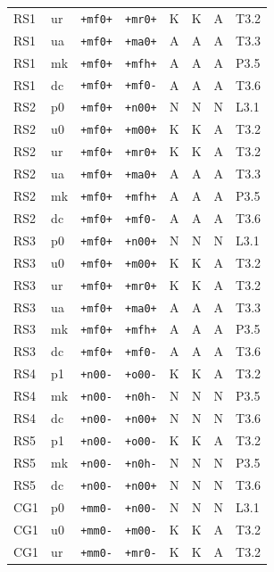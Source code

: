 {\begin{longtable}{@{}llllcccl@{}}
RS1 & ur & \texttt{+mf0+} & \texttt{+mr0+} & K & K & A & T3.2 \\
RS1 & ua & \texttt{+mf0+} & \texttt{+ma0+} & A & A & A & T3.3 \\
RS1 & mk & \texttt{+mf0+} & \texttt{+mfh+} & A & A & A & P3.5 \\
RS1 & dc & \texttt{+mf0+} & \texttt{+mf0-} & A & A & A & T3.6 \\
RS2 & p0 & \texttt{+mf0+} & \texttt{+n00+} & N & N & N & L3.1 \\
RS2 & u0 & \texttt{+mf0+} & \texttt{+m00+} & K & K & A & T3.2 \\
RS2 & ur & \texttt{+mf0+} & \texttt{+mr0+} & K & K & A & T3.2 \\
RS2 & ua & \texttt{+mf0+} & \texttt{+ma0+} & A & A & A & T3.3 \\
RS2 & mk & \texttt{+mf0+} & \texttt{+mfh+} & A & A & A & P3.5 \\
RS2 & dc & \texttt{+mf0+} & \texttt{+mf0-} & A & A & A & T3.6 \\
RS3 & p0 & \texttt{+mf0+} & \texttt{+n00+} & N & N & N & L3.1 \\
RS3 & u0 & \texttt{+mf0+} & \texttt{+m00+} & K & K & A & T3.2 \\
RS3 & ur & \texttt{+mf0+} & \texttt{+mr0+} & K & K & A & T3.2 \\
RS3 & ua & \texttt{+mf0+} & \texttt{+ma0+} & A & A & A & T3.3 \\
RS3 & mk & \texttt{+mf0+} & \texttt{+mfh+} & A & A & A & P3.5 \\
RS3 & dc & \texttt{+mf0+} & \texttt{+mf0-} & A & A & A & T3.6 \\
RS4 & p1 & \texttt{+n00-} & \texttt{+o00-} & K & K & A & T3.2 \\
RS4 & mk & \texttt{+n00-} & \texttt{+n0h-} & N & N & N & P3.5 \\
RS4 & dc & \texttt{+n00-} & \texttt{+n00+} & N & N & N & T3.6 \\
RS5 & p1 & \texttt{+n00-} & \texttt{+o00-} & K & K & A & T3.2 \\
RS5 & mk & \texttt{+n00-} & \texttt{+n0h-} & N & N & N & P3.5 \\
RS5 & dc & \texttt{+n00-} & \texttt{+n00+} & N & N & N & T3.6 \\
CG1 & p0 & \texttt{+mm0-} & \texttt{+n00-} & N & N & N & L3.1 \\
CG1 & u0 & \texttt{+mm0-} & \texttt{+m00-} & K & K & A & T3.2 \\
CG1 & ur & \texttt{+mm0-} & \texttt{+mr0-} & K & K & A & T3.2 \\

\end{longtable}}
